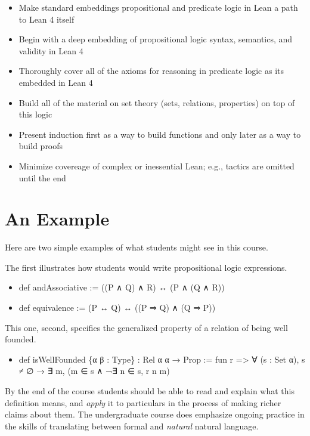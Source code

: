 \documentclass{book}
\providecommand{\tightlist}{%
  \setlength{\itemsep}{0pt}\setlength{\parskip}{0pt}}
\begin{document}
\begin{itemize}
\tightlist
\item
  Make standard embeddings propositional and predicate logic in Lean a path to Lean 4 itself
\item
  Begin with a deep embedding of propositional logic syntax, semantics, and validity in Lean 4
\item
  Thoroughly cover all of the axioms for reasoning in predicate logic as its embedded in Lean 4
\item
  Build all of the material on set theory (sets, relations, properties) on top of this logic
\item
  Present induction first as a way to build functions and only later as a way to build proofs
\item
  Minimize covereage of complex or inessential Lean; e.g., tactics are omitted until the end
\end{itemize}

\hypertarget{book__pandoc__debug__src__preface.md__an-example}{%
\section*{An Example}\label{book__pandoc__debug__src__preface.md__an-example}}

Here are two simple examples of what students might see in this course.

The first  illustrates how students would write propositional logic expressions.

\begin{itemize}
\tightlist
\item
  def andAssociative  := ((P ∧ Q) ∧ R) ↔ (P ∧ (Q ∧ R))
\item
  def equivalence     := (P ↔ Q) ↔ ((P ⇒ Q) ∧ (Q ⇒ P))
\end{itemize}

This one, second, specifies the generalized property of a relation of being well founded.

\begin{itemize}
\tightlist
\item
  def isWellFounded  \{α  β : Type\} : Rel α α → Prop := fun r =\textgreater{} ∀ (s : Set α), s ≠ ∅ → ∃ m, (m ∈ s ∧ ¬∃ n ∈ s, r n m)
\end{itemize}

By the end of the course students should be able to read and explain what this definition
means, and \emph{apply} it to particulars in the process of making richer claims about them.
The undergraduate course does emphasize ongoing practice in the skills of translating between
formal and \emph{natural} natural language.
\end{document}
